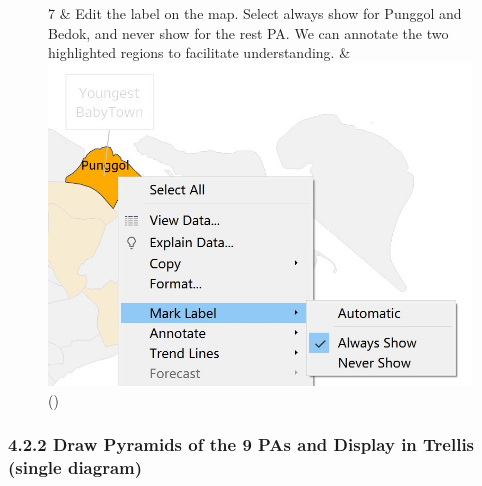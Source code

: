 \documentclass[
  letterpaper,
  DIV=11,
  numbers=noendperiod,
  oneside]{scrartcl}
\begin{document}
\begin{figure}
\begin{longtable}[]
7 & Edit the label on the map. Select always show for Punggol and Bedok,
and never show for the rest PA. We can annotate the two highlighted
regions to facilitate understanding. &
\includegraphics{images/always show.jpg} \\
\bottomrule()
\end{longtable}

\end{figure}

\hypertarget{draw-pyramids-of-the-9-pas-and-display-in-trellis-single-diagram}{%
\subsubsection{4.2.2 Draw Pyramids of the 9 PAs and Display in Trellis
(single
diagram)}\label{draw-pyramids-of-the-9-pas-and-display-in-trellis-single-diagram}}
\end{document}
